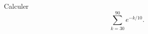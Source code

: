 \begin{exercice}\label{exotestMAT1151-G220003}

	Calculer 
	\[ 
		\sum_{k=30}^{90} e^{-k/10}.	
	\]

\end{exercice}
